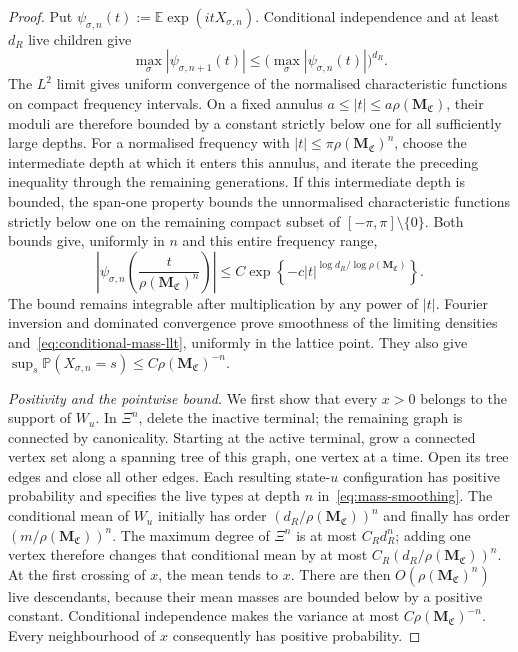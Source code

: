 \documentclass[scheme=plain,11pt]{ctexart}
\theoremstyle{definition}
\theoremstyle{remark}
\begin{document}
\begin{proof}
Put $\psi_{\sigma,n}(t):=\mathbb E\exp(itX_{\sigma,n})$.
Conditional independence and at least $d_R$ live children give
\[
 \max_\sigma|\psi_{\sigma,n+1}(t)|
 \le\bigl(\max_\sigma|\psi_{\sigma,n}(t)|\bigr)^{d_R}.
\]
The $L^2$ limit gives uniform convergence of the normalised characteristic functions on compact frequency intervals.
On a fixed annulus $a\le |t|\le a\rho(\mathbf M_{\mathfrak C})$, their moduli are therefore bounded by a constant strictly below one for all sufficiently large depths.
For a normalised frequency with $|t|\le\pi\rho(\mathbf M_{\mathfrak C})^n$, choose the intermediate depth at which it enters this annulus, and iterate the preceding inequality through the remaining generations.
If this intermediate depth is bounded, the span-one property bounds the unnormalised characteristic functions strictly below one on the remaining compact subset of $[-\pi,\pi]\setminus\{0\}$.
Both bounds give, uniformly in $n$ and this entire frequency range,
\[
 \left|\psi_{\sigma,n}\!\left(\frac{t}{\rho(\mathbf M_{\mathfrak C})^n}\right)\right|
 \le C\exp\left\{-c|t|^{\log d_R/\log\rho(\mathbf M_{\mathfrak C})}\right\}.
\]
The bound remains integrable after multiplication by any power of $|t|$.
Fourier inversion and dominated convergence prove smoothness of the limiting densities and~\eqref{eq:conditional-mass-llt}, uniformly in the lattice point.
They also give $\sup_s\mathbb P(X_{\sigma,n}=s)\le C\rho(\mathbf M_{\mathfrak C})^{-n}$.

\emph{Positivity and the pointwise bound.}
We first show that every $x>0$ belongs to the support of $W_u$.
In $\Xi^n$, delete the inactive terminal; the remaining graph is connected by canonicality.
Starting at the active terminal, grow a connected vertex set along a spanning tree of this graph, one vertex at a time.
Open its tree edges and close all other edges.
Each resulting state-$u$ configuration has positive probability and specifies the live types at depth $n$ in~\eqref{eq:mass-smoothing}.
The conditional mean of $W_u$ initially has order $(d_R/\rho(\mathbf M_{\mathfrak C}))^n$ and finally has order $(m/\rho(\mathbf M_{\mathfrak C}))^n$.
The maximum degree of $\Xi^n$ is at most $C_Rd_R^n$; adding one vertex therefore changes that conditional mean by at most $C_R(d_R/\rho(\mathbf M_{\mathfrak C}))^n$.
At the first crossing of $x$, the mean tends to $x$.
There are then $O(\rho(\mathbf M_{\mathfrak C})^n)$ live descendants, because their mean masses are bounded below by a positive constant.
Conditional independence makes the variance at most $C\rho(\mathbf M_{\mathfrak C})^{-n}$.
Every neighbourhood of $x$ consequently has positive probability.


\end{proof}
\end{document}
